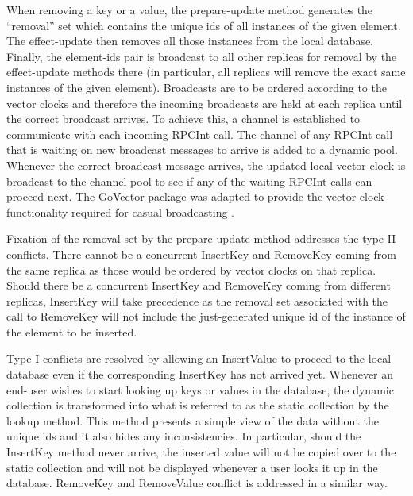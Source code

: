\documentclass[sigconf,nonacm,10pt]{acmart}
\begin{document}
When removing a key or a value, the prepare-update method generates the ``removal'' set which contains the unique ids of all instances of the given element. The effect-update then removes all those instances from the local database. Finally, the element-ids pair is broadcast to all other replicas for removal by the effect-update methods there (in particular, all replicas will remove the exact same instances of the given element).
Broadcasts are to be ordered according to the vector clocks and therefore the incoming broadcasts are held at each replica until the correct broadcast arrives. To achieve this, a channel is established to communicate with each incoming RPCInt call. The channel of any RPCInt call that is waiting on new broadcast messages to arrive is added to a dynamic pool. Whenever the correct broadcast message arrives, the updated local vector clock is broadcast to the channel pool to see if any of the waiting RPCInt calls can proceed next. The GoVector package was adapted to provide the vector clock functionality required for casual broadcasting \cite{distributedclocks}.

Fixation of the removal set by the prepare-update method addresses the type II conflicts. There cannot be a concurrent InsertKey and RemoveKey coming from the same replica as those would be ordered by vector clocks on that replica. Should there be a concurrent InsertKey and RemoveKey coming from different replicas, InsertKey will take precedence as the removal set associated with the call to RemoveKey will not include the just-generated unique id of the instance of the element to be inserted.

Type I conflicts are resolved by allowing an InsertValue to proceed to the local database even if the corresponding InsertKey has not arrived yet. Whenever an end-user wishes to start looking up keys or values in the database, the dynamic collection is transformed into what is referred to as the static collection by the lookup method. This method presents a simple view of the data without the unique ids and it also hides any inconsistencies. In particular, should the InsertKey method never arrive, the inserted value will not be copied over to the static collection and will not be displayed whenever a user looks it up in the database. RemoveKey and RemoveValue conflict is addressed in a similar way.
\end{document}
